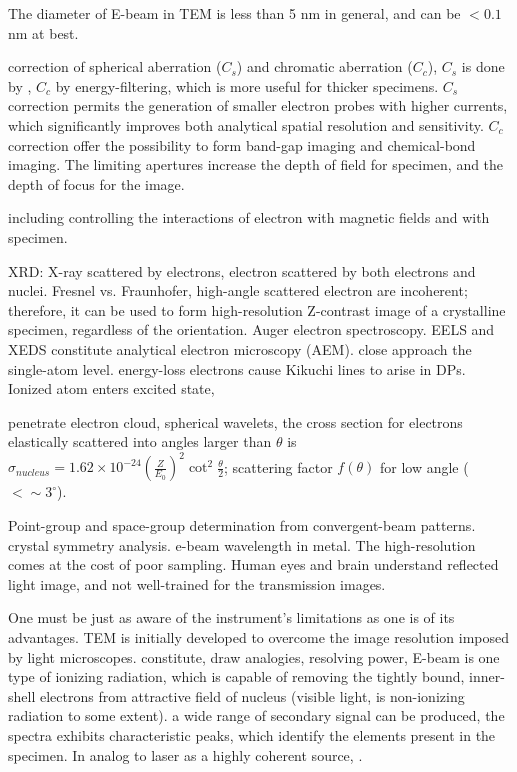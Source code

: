 The diameter of E-beam in TEM is less than 5 nm in general, and can be $< 0.1$ nm at best.

correction of spherical aberration ($C_s$) and chromatic aberration ($C_c$), $C_s$ is done by , $C_c$ by energy-filtering, which is more useful for thicker specimens. $C_s$ correction permits the generation of smaller electron probes with higher currents, which significantly improves both analytical spatial resolution and sensitivity. $C_c$ correction offer the possibility to form band-gap imaging and chemical-bond imaging. The limiting apertures increase the depth of field for specimen, and the depth of focus for the image.\cite{Williams2009} 

including controlling the interactions of electron with magnetic fields and with specimen.  

XRD: X-ray scattered by electrons, electron scattered by both electrons and nuclei. Fresnel vs. Fraunhofer, high-angle scattered electron are incoherent; therefore, it can be used to form high-resolution Z-contrast image of a crystalline specimen, regardless of the orientation. Auger electron spectroscopy. EELS and XEDS constitute analytical electron microscopy (AEM). close approach the single-atom level.  energy-loss electrons cause Kikuchi lines to arise in DPs. Ionized atom enters excited state, 

penetrate electron cloud, spherical wavelets, the cross section for electrons elastically scattered into angles larger than $\theta$ is $\sigma_{nucleus}= 1.62\times10^{-24} (\frac{Z}{E_0})^2\cot^2\frac{\theta}{2}$; scattering factor $f(\theta)$ for low angle ($< \sim 3^{\circ}$). 

Point-group and space-group determination from convergent-beam patterns. crystal symmetry analysis. e-beam wavelength in metal. The high-resolution comes at the cost of poor sampling.  Human eyes and brain understand reflected light image, and not well-trained for the transmission images.

One must be just as aware of the instrument's limitations as one is of its advantages.   TEM is initially developed to overcome the image resolution imposed by light microscopes. constitute, draw analogies, resolving power, E-beam is one type of ionizing radiation, which is capable of removing the tightly bound, inner-shell electrons from attractive field of nucleus (visible light, is non-ionizing radiation to some extent). a wide range of secondary signal can be produced, the spectra exhibits characteristic peaks, which identify the elements present in the specimen. In analog to laser as a highly coherent source, . 

